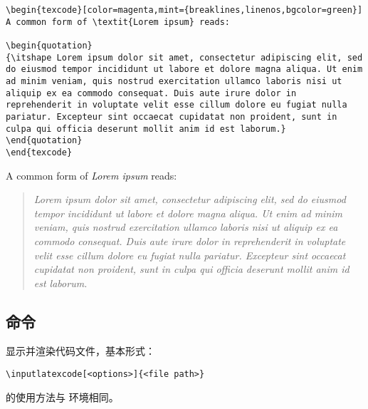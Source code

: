 \begin{verbatim}
\begin{texcode}[color=magenta,mint={breaklines,linenos,bgcolor=green}]
A common form of \textit{Lorem ipsum} reads:

\begin{quotation}
{\itshape Lorem ipsum dolor sit amet, consectetur adipiscing elit, sed do eiusmod tempor incididunt ut labore et dolore magna aliqua. Ut enim ad minim veniam, quis nostrud exercitation ullamco laboris nisi ut aliquip ex ea commodo consequat. Duis aute irure dolor in reprehenderit in voluptate velit esse cillum dolore eu fugiat nulla pariatur. Excepteur sint occaecat cupidatat non proident, sunt in culpa qui officia deserunt mollit anim id est laborum.}
\end{quotation}
\end{texcode}
\end{verbatim}

\begin{texcode}[color=magenta,mint={breaklines,linenos,bgcolor=green}]
A common form of \textit{Lorem ipsum} reads:

\begin{quotation}
{\itshape Lorem ipsum dolor sit amet, consectetur adipiscing elit, sed do eiusmod tempor incididunt ut labore et dolore magna aliqua. Ut enim ad minim veniam, quis nostrud exercitation ullamco laboris nisi ut aliquip ex ea commodo consequat. Duis aute irure dolor in reprehenderit in voluptate velit esse cillum dolore eu fugiat nulla pariatur. Excepteur sint occaecat cupidatat non proident, sunt in culpa qui officia deserunt mollit anim id est laborum.}
\end{quotation}
\end{texcode}


\subsection{\protect{} 命令}
显示并渲染代码文件，基本形式：

\begin{verbatim}
\inputlatexcode[<options>]{<file path>}
\end{verbatim}

 的使用方法与  环境相同。
